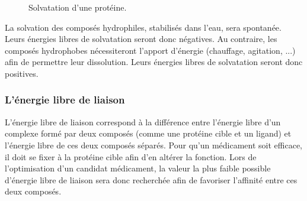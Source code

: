 \begin{figure}[h]
  \center
      \caption{Solvatation d'une protéine.}
      \label{fig:solvatation_def}
\end{figure}


La solvation des composés hydrophiles, stabilisés dans l'eau, sera spontanée. Leurs énergies libres de solvatation seront donc négatives. Au contraire, les composés hydrophobes nécessiteront l'apport d'énergie (chauffage, agitation, ...) afin de permettre leur dissolution. Leurs énergies libres de solvatation seront donc positives. 

\subsubsection{L'énergie libre de liaison}
L'énergie libre de liaison correspond à la différence  entre l'énergie libre d'un complexe formé par deux composés (comme une protéine cible et un ligand) et l'énergie libre de ces deux composés séparés. Pour qu'un médicament soit efficace, il doit se fixer à la protéine cible afin d'en altérer la fonction. Lors de l'optimisation d'un candidat médicament, la valeur la plus faible possible d'énergie libre de liaison sera donc recherchée afin de favoriser l'affinité entre ces deux composés.





